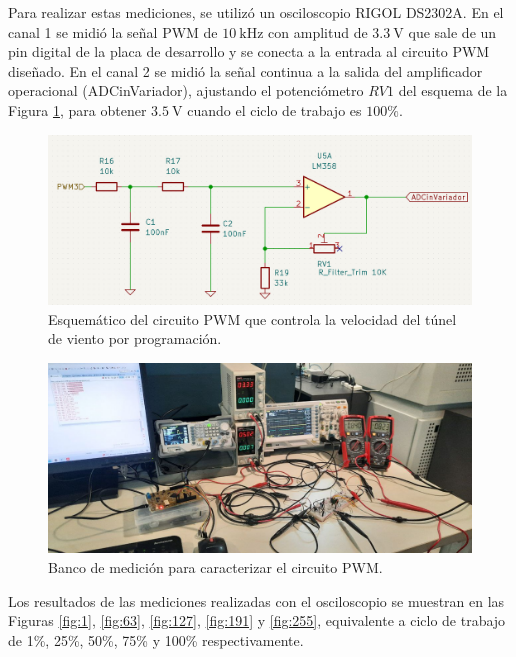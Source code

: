 Para realizar estas mediciones, se utilizó un osciloscopio RIGOL DS2302A. En el canal 1 se midió la señal PWM de $\SI{10}{\kilo\hertz}$ con amplitud de $\SI{3.3}{\volt}$ que sale de un pin digital de la placa de desarrollo y se conecta a la entrada al circuito PWM diseñado. En el canal 2 se midió la señal continua a la salida del amplificador operacional (ADCinVariador), ajustando el potenciómetro $RV1$ del esquema de la Figura \ref{fig:esquemPWM}, para obtener $\SI{3.5}{\volt}$ cuando el ciclo de trabajo es $100\%$.

\begin{figure}[H]
    \centering
    \includegraphics[width=1.1\linewidth]{Figuras/datalogger/Hardware/esquemPWM.png}
    \caption{Esquemático del circuito PWM que controla la velocidad del túnel de viento por programación.}
    \label{fig:esquemPWM}
\end{figure}

\begin{figure}[H]
    \centering
    \includegraphics[width=1.1\linewidth]{Figuras/datalogger/Hardware/BancoMedicion1.jpg}
    \caption{Banco de medición para caracterizar el circuito PWM.}
    \label{fig:BancoMedicion1}
\end{figure}

Los resultados de las mediciones realizadas con el osciloscopio se muestran en las Figuras \ref{fig:1}, \ref{fig:63}, \ref{fig:127}, \ref{fig:191} y \ref{fig:255}, equivalente a ciclo de trabajo de 1\%, 25\%, 50\%, 75\% y 100\% respectivamente.



